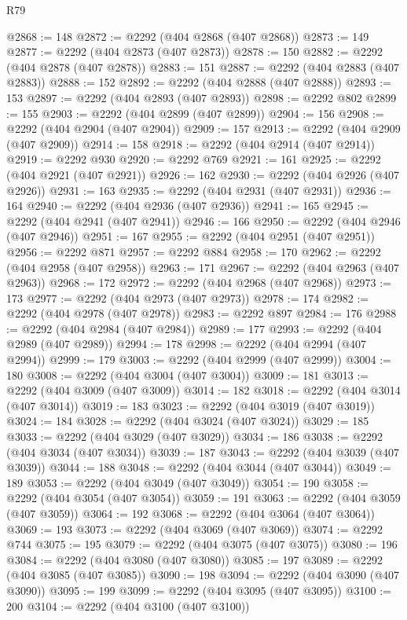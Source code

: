 \begin{lexlean}{R79}
\begin{coremodule}
@2868 := 148
@2872 := @2292 (@404 @2868 (@407 @2868))
@2873 := 149
@2877 := @2292 (@404 @2873 (@407 @2873))
@2878 := 150
@2882 := @2292 (@404 @2878 (@407 @2878))
@2883 := 151
@2887 := @2292 (@404 @2883 (@407 @2883))
@2888 := 152
@2892 := @2292 (@404 @2888 (@407 @2888))
@2893 := 153
@2897 := @2292 (@404 @2893 (@407 @2893))
@2898 := @2292 @802
@2899 := 155
@2903 := @2292 (@404 @2899 (@407 @2899))
@2904 := 156
@2908 := @2292 (@404 @2904 (@407 @2904))
@2909 := 157
@2913 := @2292 (@404 @2909 (@407 @2909))
@2914 := 158
@2918 := @2292 (@404 @2914 (@407 @2914))
@2919 := @2292 @930
@2920 := @2292 @769
@2921 := 161
@2925 := @2292 (@404 @2921 (@407 @2921))
@2926 := 162
@2930 := @2292 (@404 @2926 (@407 @2926))
@2931 := 163
@2935 := @2292 (@404 @2931 (@407 @2931))
@2936 := 164
@2940 := @2292 (@404 @2936 (@407 @2936))
@2941 := 165
@2945 := @2292 (@404 @2941 (@407 @2941))
@2946 := 166
@2950 := @2292 (@404 @2946 (@407 @2946))
@2951 := 167
@2955 := @2292 (@404 @2951 (@407 @2951))
@2956 := @2292 @871
@2957 := @2292 @884
@2958 := 170
@2962 := @2292 (@404 @2958 (@407 @2958))
@2963 := 171
@2967 := @2292 (@404 @2963 (@407 @2963))
@2968 := 172
@2972 := @2292 (@404 @2968 (@407 @2968))
@2973 := 173
@2977 := @2292 (@404 @2973 (@407 @2973))
@2978 := 174
@2982 := @2292 (@404 @2978 (@407 @2978))
@2983 := @2292 @897
@2984 := 176
@2988 := @2292 (@404 @2984 (@407 @2984))
@2989 := 177
@2993 := @2292 (@404 @2989 (@407 @2989))
@2994 := 178
@2998 := @2292 (@404 @2994 (@407 @2994))
@2999 := 179
@3003 := @2292 (@404 @2999 (@407 @2999))
@3004 := 180
@3008 := @2292 (@404 @3004 (@407 @3004))
@3009 := 181
@3013 := @2292 (@404 @3009 (@407 @3009))
@3014 := 182
@3018 := @2292 (@404 @3014 (@407 @3014))
@3019 := 183
@3023 := @2292 (@404 @3019 (@407 @3019))
@3024 := 184
@3028 := @2292 (@404 @3024 (@407 @3024))
@3029 := 185
@3033 := @2292 (@404 @3029 (@407 @3029))
@3034 := 186
@3038 := @2292 (@404 @3034 (@407 @3034))
@3039 := 187
@3043 := @2292 (@404 @3039 (@407 @3039))
@3044 := 188
@3048 := @2292 (@404 @3044 (@407 @3044))
@3049 := 189
@3053 := @2292 (@404 @3049 (@407 @3049))
@3054 := 190
@3058 := @2292 (@404 @3054 (@407 @3054))
@3059 := 191
@3063 := @2292 (@404 @3059 (@407 @3059))
@3064 := 192
@3068 := @2292 (@404 @3064 (@407 @3064))
@3069 := 193
@3073 := @2292 (@404 @3069 (@407 @3069))
@3074 := @2292 @744
@3075 := 195
@3079 := @2292 (@404 @3075 (@407 @3075))
@3080 := 196
@3084 := @2292 (@404 @3080 (@407 @3080))
@3085 := 197
@3089 := @2292 (@404 @3085 (@407 @3085))
@3090 := 198
@3094 := @2292 (@404 @3090 (@407 @3090))
@3095 := 199
@3099 := @2292 (@404 @3095 (@407 @3095))
@3100 := 200
@3104 := @2292 (@404 @3100 (@407 @3100))

\end{coremodule}
\end{lexlean}
